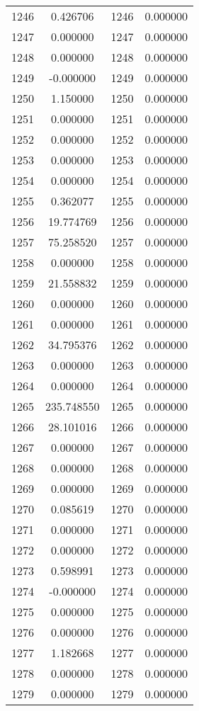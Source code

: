 \documentclass[12pt]{article}
\begin{document}
\begin{longtable}{@{}cccc@{}}
1246 & 0.426706 & 1246 & 0.000000 \\
1247 & 0.000000 & 1247 & 0.000000 \\
1248 & 0.000000 & 1248 & 0.000000 \\
1249 & -0.000000 & 1249 & 0.000000 \\
1250 & 1.150000 & 1250 & 0.000000 \\
1251 & 0.000000 & 1251 & 0.000000 \\
1252 & 0.000000 & 1252 & 0.000000 \\
1253 & 0.000000 & 1253 & 0.000000 \\
1254 & 0.000000 & 1254 & 0.000000 \\
1255 & 0.362077 & 1255 & 0.000000 \\
1256 & 19.774769 & 1256 & 0.000000 \\
1257 & 75.258520 & 1257 & 0.000000 \\
1258 & 0.000000 & 1258 & 0.000000 \\
1259 & 21.558832 & 1259 & 0.000000 \\
1260 & 0.000000 & 1260 & 0.000000 \\
1261 & 0.000000 & 1261 & 0.000000 \\
1262 & 34.795376 & 1262 & 0.000000 \\
1263 & 0.000000 & 1263 & 0.000000 \\
1264 & 0.000000 & 1264 & 0.000000 \\
1265 & 235.748550 & 1265 & 0.000000 \\
1266 & 28.101016 & 1266 & 0.000000 \\
1267 & 0.000000 & 1267 & 0.000000 \\
1268 & 0.000000 & 1268 & 0.000000 \\
1269 & 0.000000 & 1269 & 0.000000 \\
1270 & 0.085619 & 1270 & 0.000000 \\
1271 & 0.000000 & 1271 & 0.000000 \\
1272 & 0.000000 & 1272 & 0.000000 \\
1273 & 0.598991 & 1273 & 0.000000 \\
1274 & -0.000000 & 1274 & 0.000000 \\
1275 & 0.000000 & 1275 & 0.000000 \\
1276 & 0.000000 & 1276 & 0.000000 \\
1277 & 1.182668 & 1277 & 0.000000 \\
1278 & 0.000000 & 1278 & 0.000000 \\
1279 & 0.000000 & 1279 & 0.000000 \\

\end{longtable}
\end{document}
